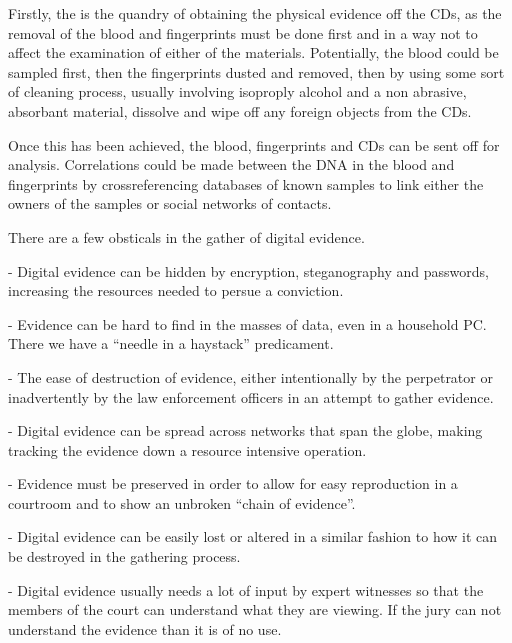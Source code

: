 

Firstly, the is the quandry of obtaining the physical evidence off the CDs, as the removal of the blood and fingerprints must be done first and in a way not to affect the examination of either of the materials. Potentially, the blood could be sampled first, then the fingerprints dusted and removed, then by using some sort of cleaning process, usually involving isoproply alcohol and a non abrasive, absorbant material, dissolve and wipe off any foreign objects from the CDs.

Once this has been achieved, the blood, fingerprints and CDs can be sent off for analysis. Correlations could be made between the DNA in the blood and fingerprints by crossreferencing databases of known samples to link either the owners of the samples or social networks of contacts.


There are a few obsticals in the gather of digital evidence.

\item{-} Digital evidence can be hidden by encryption, steganography and passwords, increasing the resources needed to persue a conviction.
\item{-} Evidence can be hard to find in the masses of data, even in a household PC. There we have a ``needle in a haystack'' predicament.
\item{-} The ease of destruction of evidence, either intentionally by the perpetrator or inadvertently by the law enforcement officers in an attempt to gather evidence.
\item{-} Digital evidence can be spread across networks that span the globe, making tracking the evidence down a resource intensive operation.
\item{-} Evidence must be preserved in order to allow for easy reproduction in a courtroom and to show an unbroken ``chain of evidence''.
\item{-} Digital evidence can be easily lost or altered in a similar fashion to how it can be destroyed in the gathering process.
\item{-} Digital evidence usually needs a lot of input by expert witnesses so that the members of the court can understand what they are viewing. If the jury can not understand the evidence than it is of no use.




